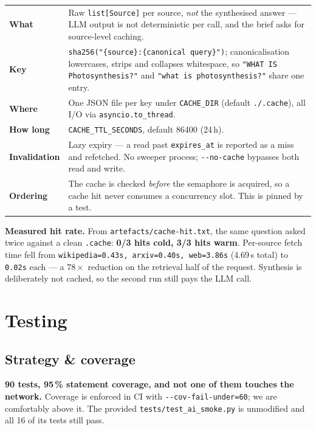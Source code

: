 \documentclass[11pt,a4paper]{article}
\begin{document}
\begin{tabularx}{\textwidth}{@{}lX@{}}
\toprule
\textbf{What} & Raw \texttt{list[Source]} per source, \emph{not} the synthesised answer --- LLM
output is not deterministic per call, and the brief asks for source-level caching. \\
\addlinespace
\textbf{Key} & \texttt{sha256("\{source\}:\{canonical query\}")}; canonicalisation lowercases,
strips and collapses whitespace, so \texttt{"WHAT IS   Photosynthesis?"} and
\texttt{"what is photosynthesis?"} share one entry. \\
\addlinespace
\textbf{Where} & One JSON file per key under \texttt{CACHE\_DIR} (default \texttt{./.cache}), all
I/O via \texttt{asyncio.to\_thread}. \\
\addlinespace
\textbf{How long} & \texttt{CACHE\_TTL\_SECONDS}, default 86400 (24\,h). \\
\addlinespace
\textbf{Invalidation} & Lazy expiry --- a read past \texttt{expires\_at} is reported as a miss and
refetched. No sweeper process; \texttt{-{}-no-cache} bypasses both read and write. \\
\addlinespace
\textbf{Ordering} & The cache is checked \emph{before} the semaphore is acquired, so a cache hit
never consumes a concurrency slot. This is pinned by a test. \\
\bottomrule
\end{tabularx}

\vspace{0.5em}
\textbf{Measured hit rate.} From \texttt{artefacts/cache-hit.txt}, the same question asked twice
against a clean \texttt{.cache}: \textbf{0/3 hits cold, 3/3 hits warm}. Per-source fetch time fell
from \texttt{wikipedia=0.43s, arxiv=0.40s, web=3.86s} (4.69\,s total) to \texttt{0.02s} each --- a
$78\times$ reduction on the retrieval half of the request. Synthesis is deliberately not cached, so
the second run still pays the LLM call.

\section{Testing}\label{sec:testing}

\subsection{Strategy \& coverage}

\textbf{90 tests, 95\,\% statement coverage, and not one of them touches the network.} Coverage is
enforced in CI with \texttt{-{}-cov-fail-under=60}; we are comfortably above it. The provided
\texttt{tests/test\_ai\_smoke.py} is unmodified and all 16 of its tests still pass.
\end{document}

